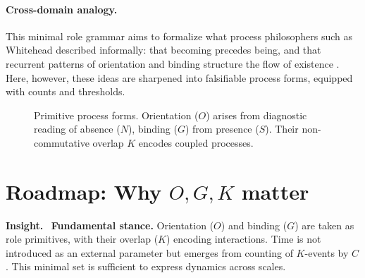 \documentclass[12pt,a4paper,oneside]{scrreprt}
\newenvironment{insight}{\par\vspace{0.5em}\noindent\textbf{Insight.}\ }{\par\vspace{0.5em}}
\begin{document}
\paragraph{Cross-domain analogy.} 
This minimal role grammar aims to formalize what process philosophers such as Whitehead described informally: 
that becoming precedes being, and that recurrent patterns of orientation and binding structure the flow of existence \citep{Whitehead1929Process}. 
Here, however, these ideas are sharpened into falsifiable process forms, equipped with counts and thresholds.

\begin{figure}[ht]
\centering
{}
\caption{Primitive process forms. Orientation ($O$) arises from diagnostic reading of absence ($N$), 
binding ($G$) from presence ($S$). Their non-commutative overlap $K$ encodes coupled processes.}
\label{fig:primitive-forms}
\end{figure}

\section*{Roadmap: Why $O,G,K$ matter}
\begin{insight}
\textbf{Fundamental stance.} 
Orientation ($O$) and binding ($G$) are taken as role primitives, 
with their overlap ($K$) encoding interactions. 
Time is not introduced as an external parameter but emerges from counting 
of $K$-events by $C$. 
This minimal set is sufficient to express dynamics across scales.
\end{insight}
\end{document}
